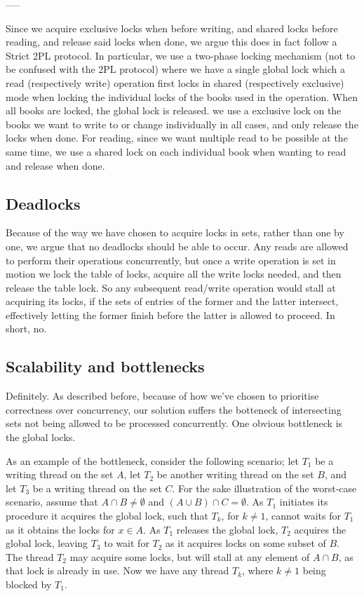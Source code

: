 -----

Since we acquire exclusive locks when before writing, and shared locks before reading, and release said locks when done, we argue this does in fact follow a Strict 2PL protocol. In particular, we use a two-phase locking mechanism (not to be confused with the 2PL protocol) where we have a single global lock which a read (respectively write) operation first locks in shared (respectively exclusive) mode when locking the individual locks of the books used in the operation. When all books are locked, the global lock is released. we use a exclusive lock on the books we want to write to or change individually in all cases, and only release the locks when done. For reading, since we want multiple read to be possible at the same time, we use a shared lock on each individual book when wanting to read and release when done.

\subsection{Deadlocks}
Because of the way we have chosen to acquire locks in sets, rather than one by
one, we argue that no deadlocks should be able to occur. Any reads are allowed
to perform their operations concurrently, but once a write operation is set in
motion we lock the table of locks, acquire all the write locks needed, and then
release the table lock. So any subsequent read/write operation would stall at
acquiring its locks, if the sets of entries of the former and the latter
intersect, effectively letting the former finish before the latter is allowed
to proceed. In short, no.

\subsection{Scalability and bottlenecks}
Definitely. As described before, because of how we've chosen to prioritise
correctness over concurrency, our solution suffers the botteneck of intersecting
sets not being allowed to be processed concurrently.
One obvious bottleneck is the global locks.

As an example of the bottleneck, consider the following scenario; let $T_1$ be
a writing thread on the set $A$, let $T_2$ be another writing thread on the set
$B$, and let $T_3$ be a writing thread on the set $C$. For the sake illustration
of the worst-case scenario, assume that $A \cap B \neq \emptyset$ and $(A \cup B)
\cap C = \emptyset$. As $T_1$ initiates its procedure it acquires the global lock,
such that $T_k$, for $k \neq 1$, cannot waits for $T_1$ as it obtains the locks
for $x \in A$. As $T_1$ releases the global lock, $T_2$ acquires the global lock,
leaving $T_3$ to wait for $T_2$ as it acquires locks on some subset of $B$. The
thread $T_2$ may acquire some locks, but will stall at any element of $A \cap B$,
as that lock is already in use. Now we have any thread $T_k$, where $k \neq 1$
being blocked by $T_1$.

